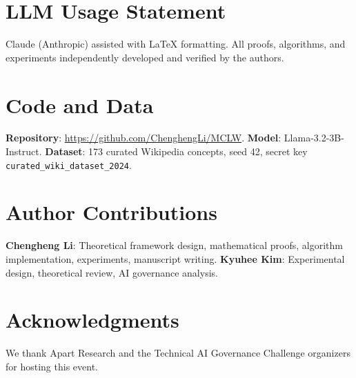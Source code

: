\documentclass[11pt]{article}
\theoremstyle{definition}
\theoremstyle{remark}
\begin{document}
\section*{LLM Usage Statement}

\noindent
Claude (Anthropic) assisted with LaTeX formatting. All proofs, algorithms, and experiments independently developed and verified by the authors.


\section*{Code and Data}

\noindent
\textbf{Repository}: \url{https://github.com/ChenghengLi/MCLW}. \textbf{Model}: Llama-3.2-3B-Instruct. \textbf{Dataset}: 173 curated Wikipedia concepts, seed 42, secret key \texttt{curated\_wiki\_dataset\_2024}.

\section*{Author Contributions}

\noindent
\textbf{Chengheng Li}: Theoretical framework design, mathematical proofs, algorithm implementation, experiments, manuscript writing. \textbf{Kyuhee Kim}: Experimental design, theoretical review, AI governance analysis.

\section*{Acknowledgments}

\noindent
We thank Apart Research and the Technical AI Governance Challenge organizers for hosting this event.




\newpage
\appendix
\end{document}
